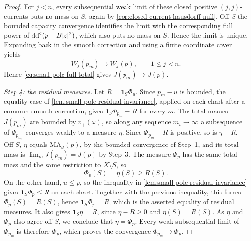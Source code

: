 \begin{proof}
For $j<n$, every subsequential weak limit of these closed positive $(j,j)$-currents puts no mass on $S$, again by \cref{cor:closed-current-hausdorff-null}. Off $S$ the bounded capacity convergence identifies the limit with the corresponding full power of $\mathrm{dd}^{\mathrm{c}}(p+B|z|^2)$, which also puts no mass on $S$. Hence the limit is unique. Expanding back in the smooth correction and using a finite coordinate cover yields
\[
 W_j(p_m)\longrightarrow W_j(p),\qquad 1\leq j<n.
\]
Hence \eqref{eq:small-pole-full-total} gives $J(p_m)\to J(p)$.

\emph{Step 4: the residual measures.} Let $R=\mathbf1_S\Phi_u$. Since $p_m-u$ is bounded, the equality case of \cref{lem:small-pole-residual-invariance}, applied on each chart after a common smooth correction, gives $\mathbf1_S\Phi_{p_m}=R$ for every $m$. The total masses $J(p_m)$ are bounded by $v_+(\omega)$, so along any sequence $m_i\to\infty$ a subsequence of $\Phi_{p_{m_i}}$ converges weakly to a measure $\eta$. Since $\Phi_{p_m}-R$ is positive, so is $\eta-R$. Off $S$, $\eta$ equals $\mathrm{MA}_\omega(p)$, by the bounded convergence of Step~1, and its total mass is $\lim_mJ(p_m)=J(p)$ by Step~3. The measure $\Phi_p$ has the same total mass and the same restriction to $X\setminus S$, so
\[
 \Phi_p(S)=\eta(S)\geq R(S).
\]
On the other hand, $u\leq p$, so the inequality in \cref{lem:small-pole-residual-invariance} gives $\mathbf1_S\Phi_p\leq R$ on each chart. Together with the previous inequality, this forces $\Phi_p(S)=R(S)$, hence $\mathbf1_S\Phi_p=R$, which is the asserted equality of residual measures. It also gives $\mathbf1_S\eta=R$, since $\eta-R\geq0$ and $\eta(S)=R(S)$. As $\eta$ and $\Phi_p$ also agree off $S$, we conclude that $\eta=\Phi_p$. Every weak subsequential limit of $\Phi_{p_m}$ is therefore $\Phi_p$, which proves the convergence $\Phi_{p_m}\to\Phi_p$.
\end{proof}
